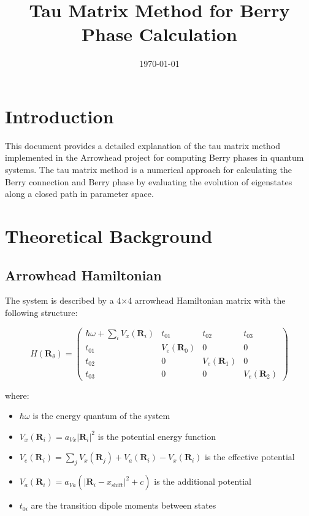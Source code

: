 \documentclass{article}
\title{Tau Matrix Method for Berry Phase Calculation}
\author{}
\date{\today}
\begin{document}
\maketitle

\section{Introduction}

This document provides a detailed explanation of the tau matrix method implemented in the Arrowhead project for computing Berry phases in quantum systems. The tau matrix method is a numerical approach for calculating the Berry connection and Berry phase by evaluating the evolution of eigenstates along a closed path in parameter space.

\section{Theoretical Background}

\subsection{Arrowhead Hamiltonian}

The system is described by a 4×4 arrowhead Hamiltonian matrix with the following structure:

\begin{equation}
H(\bm{R}_{\theta}) = 
\begin{pmatrix}
\hbar\omega + \sum_i V_x(\bm{R}_i) & t_{01} & t_{02} & t_{03} \\
t_{01} & V_e(\bm{R}_0) & 0 & 0 \\
t_{02} & 0 & V_e(\bm{R}_1) & 0 \\
t_{03} & 0 & 0 & V_e(\bm{R}_2)
\end{pmatrix}
\end{equation}

where:
\begin{itemize}
    \item $\hbar\omega$ is the energy quantum of the system
    \item $V_x(\bm{R}_i) = a_{Vx} |\bm{R}_i|^2$ is the potential energy function
    \item $V_e(\bm{R}_i) = \sum_j V_x(\bm{R}_j) + V_a(\bm{R}_i) - V_x(\bm{R}_i)$ is the effective potential
    \item $V_a(\bm{R}_i) = a_{Va} (|\bm{R}_i - x_{\text{shift}}|^2 + c)$ is the additional potential
    \item $t_{0i}$ are the transition dipole moments between states
\end{itemize}
\end{document}
